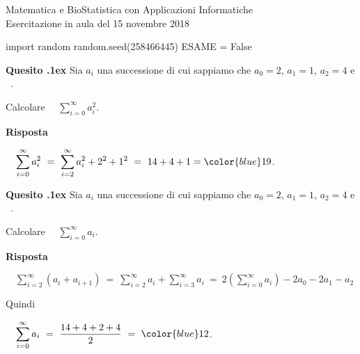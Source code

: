 \documentclass[11pt,twoside,a4paper]{article}
\newcounter{quesito}
\newenvironment{question}{\addtocounter{quesito}{1}\par\textbf{Quesito \thequesito.\kern1ex}}{\vspace{0.5\parskip}}
\newenvironment{answer}{\par\textbf{Risposta\quad}}{\vspace{\parskip}}
\begin{document}
\colorbox{blue!10}{\begin{minipage}{\textwidth}
Matematica e BioStatistica con Applicazioni Informatiche\\
Esercitazione in aula del 15 novembre 2018
\end{minipage}}


\begin{pycode}
import random
random.seed(258466445)
ESAME = False
\end{pycode}

\begin{question}
Sia $a_i$ una successione di cui sappiamo che $a_0=2$, $a_1=1$, $a_2=4$ e \ 
.

Calcolare 
$\quad\displaystyle\sum^{\infty}_{i=0}a^2_i$.

\begin{answer}

$\quad\displaystyle\sum^{\infty}_{i=0}a^2_i
\ =\ \sum^{\infty}_{i=2}a^2_i+2^2+1^2
\ =\ 14+4+1={\color{blue}19}$.
\end{answer}
\end{question}


\begin{question}
Sia $a_i$ una successione di cui sappiamo che $a_0=2$, $a_1=1$, $a_2=4$ e \ 
\smash{$\displaystyle\sum^{\infty}_{i=2} (a_i+a_{i+1})
\ =\ 
14$}.

Calcolare
$\quad\displaystyle\sum^{\infty}_{i=0}a_i$.

\begin{answer}

$\quad\displaystyle\sum^{\infty}_{i=2}(a_i+a_{i+1})
\ =\ 
\sum^{\infty}_{i=2}a_i+ \sum^{\infty}_{i=3}a_i
\ =\ 
2\left(\sum^{\infty}_{i=0}a_i\right) - 2a_0 -2a_1 -a_2$

Quindi

$\quad\displaystyle\sum^{\infty}_{i=0}a_i
\ =\ 
\dfrac{14+4+ 2 + 4}{2}
\ =\ 
{\color{blue}12}$.
\end{answer}
\end{question}
\end{document}
